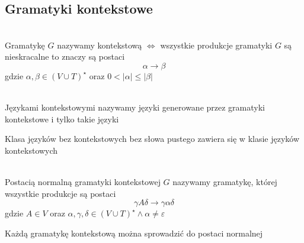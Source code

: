 \subsection{Gramatyki kontekstowe}

	\begin{df}~\\
		Gramatykę $G$ nazywamy kontekstową $\Leftrightarrow$ wszystkie produkcje gramatyki $G$ są nieskracalne
		to znaczy są postaci 
		\begin{equation}
			\alpha\rightarrow\beta
		\end{equation}
	    gdzie $\alpha,\beta\in (V\cup T)^\star$ oraz $0<|\alpha|\leqslant |\beta|$
	\end{df}			
		
	\begin{df}~\\
		Językami kontekstowymi nazywamy języki generowane przez gramatyki kontekstowe i tylko takie języki
	\end{df}	
	
	\begin{tw}
		Klasa języków bez kontekstowych bez słowa pustego zawiera się w klasie języków kontekstowych
	\end{tw}

	\begin{df}~\\
		Postacią normalną gramatyki kontekstowej $G$ nazywamy gramatykę, której wszystkie produkcje są postaci
		\begin{equation}
			\gamma A \delta \rightarrow \gamma \alpha \delta
		\end{equation}
		gdzie $A\in V$ oraz $\alpha,\gamma,\delta\in (V\cup T)^\star \wedge \alpha \neq \varepsilon$
	\end{df}
	
	\begin{lemat}
		Każdą gramatykę kontekstową można sprowadzić do postaci normalnej
	\end{lemat}
	
